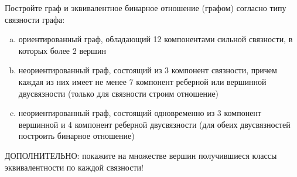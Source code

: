 \question 
Постройте граф и эквивалентное бинарное отношение (графом) согласно типу связности графа:\\
\begin{enumerate} [a)]\setcounter{enumi}{0}
\item ориентированный граф, обладающий 12 компонентами сильной связности, в которых более 2 вершин
\item неориентированный граф, состоящий из 3 компонент связности, причем каждая из них имеет не менее 7 компонент реберной или вершинной двусвязности (только для связности строим отношение)
\item неориентированный граф, состоящий одновременно из 3 компонент вершинной и 4 компонент реберной двусвязности (для обеих двусвязностей построить бинарное отношение)
\end{enumerate} 
ДОПОЛНИТЕЛЬНО: покажите на множестве вершин получившиеся классы эквивалентности по каждой связности!